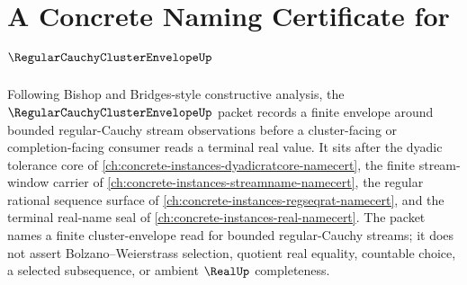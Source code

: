 \chapter{A Concrete Naming Certificate for $\RegularCauchyClusterEnvelopeUp$}
\label{ch:concrete-instances-regular-cauchy-cluster-envelope-namecert}

Following Bishop and Bridges-style constructive analysis, the $\RegularCauchyClusterEnvelopeUp$ packet records a finite envelope around bounded regular-Cauchy stream observations before a cluster-facing or completion-facing consumer reads a terminal real value. It sits after the dyadic tolerance core of \autoref{ch:concrete-instances-dyadicratcore-namecert}, the finite stream-window carrier of \autoref{ch:concrete-instances-streamname-namecert}, the regular rational sequence surface of \autoref{ch:concrete-instances-regseqrat-namecert}, and the terminal real-name seal of \autoref{ch:concrete-instances-real-namecert}. The packet names a finite cluster-envelope read for bounded regular-Cauchy streams; it does not assert Bolzano--Weierstrass selection, quotient real equality, countable choice, a selected subsequence, or ambient $\RealUp$ completeness.

